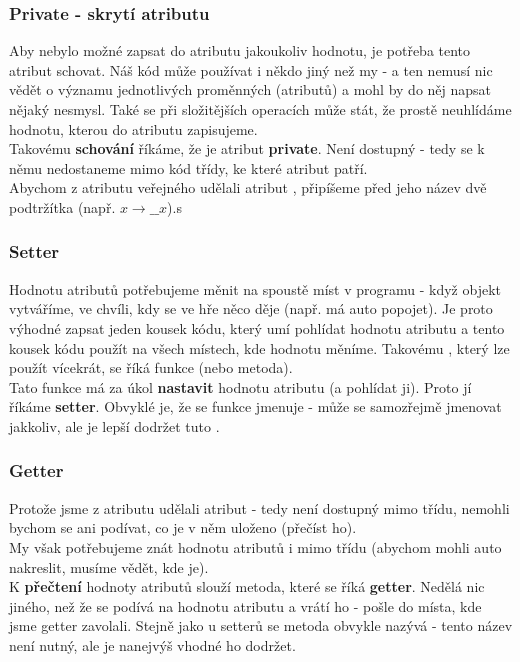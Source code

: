 \subsubsection{Private - skrytí atributu}
Aby nebylo možné zapsat do atributu jakoukoliv hodnotu, je potřeba tento atribut schovat. Náš kód může používat i někdo jiný než my - a ten nemusí nic vědět o významu jednotlivých proměnných (atributů) a mohl by do něj napsat nějaký nesmysl. Také se při složitějších operacích může stát, že prostě neuhlídáme hodnotu, kterou do atributu zapisujeme.\\
Takovému \textbf{schování} říkáme, že je atribut \textbf{private}. Není dostupný  - tedy se k němu nedostaneme mimo kód třídy, ke které atribut patří.\\
Abychom z atributu veřejného udělali atribut , připíšeme před jeho název dvě podtržítka (např. $ x \rightarrow \_\_x $).s

\subsubsection{Setter}
Hodnotu atributů potřebujeme měnit na spoustě míst v programu - když objekt vytváříme, ve chvíli, kdy se ve hře něco děje (např. má auto popojet). Je proto výhodné zapsat jeden kousek kódu, který umí pohlídat hodnotu atributu a tento kousek kódu použít na všech místech, kde hodnotu měníme. Takovému , který lze použít vícekrát, se říká funkce (nebo metoda).\\ Tato funkce má za úkol \textbf{nastavit} hodnotu atributu (a pohlídat ji).  Proto jí říkáme \textbf{setter}. Obvyklé je, že se funkce jmenuje  - může se samozřejmě jmenovat jakkoliv, ale je lepší dodržet tuto .\\

\subsubsection{Getter}
Protože jsme z atributu udělali atribut  - tedy není dostupný mimo třídu, nemohli bychom se ani podívat, co je v něm uloženo (přečíst ho).\\My však potřebujeme znát hodnotu atributů i mimo třídu (abychom mohli auto nakreslit, musíme vědět, kde je).\\
K \textbf{přečtení} hodnoty  atributů slouží metoda, které se říká \textbf{getter}. Nedělá nic jiného, než že se podívá na hodnotu atributu a vrátí ho - pošle do místa, kde jsme getter zavolali. Stejně jako u setterů se metoda obvykle nazývá  - tento název není nutný, ale je nanejvýš vhodné ho dodržet. 

